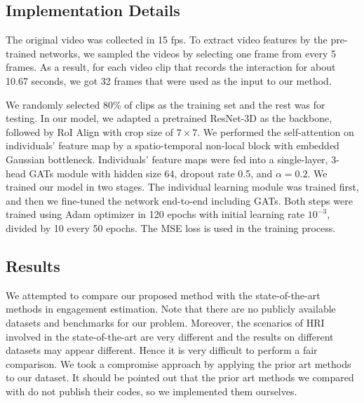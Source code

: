 \documentclass[VANCOUVER,STIX1COL]{WileyNJD-v2}
\begin{document}
\subsection{Implementation Details}
\label{subs:Implementation_Details}

The original video was collected in 15 fps. To extract video features by the pre-trained networks, we sampled the videos by selecting one frame from every 5 frames. As a result, for each video clip that records the interaction for about 10.67 seconds, we got 32 frames that were used as the input to our method.

We randomly selected 80\% of clips as the training set and the rest was for testing. In our model, we adapted a pretrained ResNet-3D as the backbone, followed by RoI Align with crop size of $7\times7$. We performed the self-attention on individuals' feature map by a spatio-temporal non-local block with embedded Gaussian bottleneck. Individuals' feature maps were fed into a single-layer, 3-head GATs module with hidden size 64, dropout rate 0.5, and $\alpha = 0.2$. We trained our model in two stages. The individual learning module was trained first, and then we fine-tuned the network end-to-end including GATs. Both steps were trained using Adam optimizer in 120 epochs with initial learning rate $10^{-3}$, divided by 10 every 50 epochs. The MSE loss is used in the training process.

\subsection{Results}
\label{subs:Main_Results}

We attempted to compare our proposed method with the state-of-the-art methods in engagement estimation. Note that there are no publicly available datasets and benchmarks for our problem. Moreover, the scenarios of HRI involved in the state-of-the-art are very different and the results on different datasets may appear different.
Hence it is very difficult to perform a fair comparison. We took a compromise approach by applying the prior art methods to our dataset. It should be pointed out that the prior art methods we compared with do not publish their codes, so we implemented them ourselves.
\end{document}
